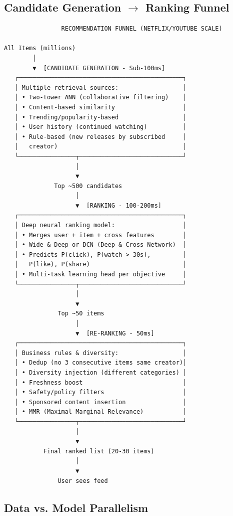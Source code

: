 \documentclass[11pt]{article}
\begin{document}
\subsection{\texorpdfstring{Candidate Generation \(\rightarrow\) Ranking Funnel}{Candidate Generation \textbackslash rightarrow Ranking Funnel}}\label{candidate-generation-rightarrow-ranking-funnel}

\setcodelang{}

\begin{verbatim}
                RECOMMENDATION FUNNEL (NETFLIX/YOUTUBE SCALE)

All Items (millions)
        │
        ▼  [CANDIDATE GENERATION - Sub-100ms]
   ┌──────────────────────────────────────────────┐
   │ Multiple retrieval sources:                  │
   │ • Two-tower ANN (collaborative filtering)    │
   │ • Content-based similarity                   │
   │ • Trending/popularity-based                  │
   │ • User history (continued watching)          │
   │ • Rule-based (new releases by subscribed     │
   │   creator)                                   │
   └────────────────┬─────────────────────────────┘
                    │
                    ▼
              Top ~500 candidates
                    │
                    ▼  [RANKING - 100-200ms]
   ┌──────────────────────────────────────────────┐
   │ Deep neural ranking model:                   │
   │ • Merges user + item + cross features        │
   │ • Wide & Deep or DCN (Deep & Cross Network)  │
   │ • Predicts P(click), P(watch > 30s),         │
   │   P(like), P(share)                          │
   │ • Multi-task learning head per objective     │
   └────────────────┬─────────────────────────────┘
                    │
                    ▼
               Top ~50 items
                    │
                    ▼  [RE-RANKING - 50ms]
   ┌──────────────────────────────────────────────┐
   │ Business rules & diversity:                  │
   │ • Dedup (no 3 consecutive items same creator)│
   │ • Diversity injection (different categories) │
   │ • Freshness boost                            │
   │ • Safety/policy filters                      │
   │ • Sponsored content insertion                │
   │ • MMR (Maximal Marginal Relevance)           │
   └────────────────┬─────────────────────────────┘
                    │
                    ▼
           Final ranked list (20-30 items)
                    │
                    ▼
               User sees feed
\end{verbatim}

\subsection{Data vs. Model Parallelism}\label{data-vs-model-parallelism}
\end{document}
